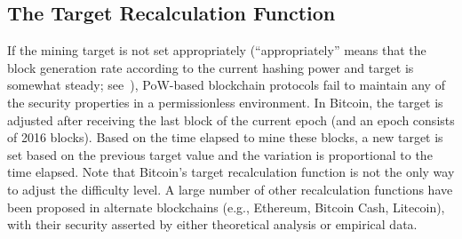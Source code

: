 \subsection{The Target Recalculation Function}
\label{subsec:target-recalculation-function}

If the mining target is not set appropriately (``appropriately'' means that the block generation rate according to the current hashing power and target is somewhat steady; see~\cite{C:GarKiaLeo17}), PoW-based blockchain protocols fail to maintain any of the security properties in a permissionless environment.
%
In Bitcoin, the target is adjusted after receiving the last block of the current epoch (and an epoch consists of 2016 blocks).
%
Based on the time elapsed to mine these blocks, a new target is set based on the previous target value and the variation is proportional to the time elapsed.
%
Note that Bitcoin's target recalculation function is not the only way to adjust the difficulty level.
%
A large number of other recalculation functions have been proposed in alternate blockchains (e.g., Ethereum, Bitcoin Cash, Litecoin), with their security asserted by either theoretical analysis or empirical data.

